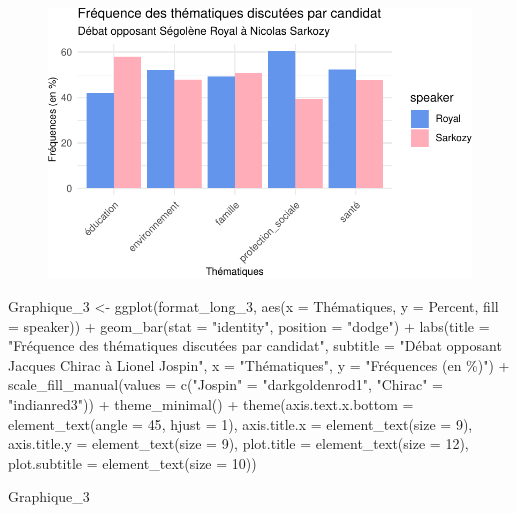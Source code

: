 \documentclass[
  letterpaper,
  DIV=11,
  numbers=noendperiod]{scrartcl}
\newenvironment{Shaded}{\begin{snugshade}}{\end{snugshade}}
\newcommand{\AttributeTok}[1]{\textcolor[rgb]{0.40,0.45,0.13}{#1}}
\newcommand{\DecValTok}[1]{\textcolor[rgb]{0.68,0.00,0.00}{#1}}
\newcommand{\FunctionTok}[1]{\textcolor[rgb]{0.28,0.35,0.67}{#1}}
\newcommand{\NormalTok}[1]{\textcolor[rgb]{0.00,0.23,0.31}{#1}}
\newcommand{\OtherTok}[1]{\textcolor[rgb]{0.00,0.23,0.31}{#1}}
\newcommand{\SpecialCharTok}[1]{\textcolor[rgb]{0.37,0.37,0.37}{#1}}
\newcommand{\StringTok}[1]{\textcolor[rgb]{0.13,0.47,0.30}{#1}}
\begin{document}
\begin{figure}[H]

{\centering \includegraphics{Travail-Session_files/figure-pdf/unnamed-chunk-2-2.pdf}

}

\end{figure}

\begin{Shaded}
\begin{Highlighting}[]
\NormalTok{Graphique\_3 }\OtherTok{\textless{}{-}} \FunctionTok{ggplot}\NormalTok{(format\_long\_3, }\FunctionTok{aes}\NormalTok{(}\AttributeTok{x =}\NormalTok{ Thématiques, }\AttributeTok{y =}\NormalTok{ Percent, }\AttributeTok{fill =}\NormalTok{ speaker)) }\SpecialCharTok{+} \FunctionTok{geom\_bar}\NormalTok{(}\AttributeTok{stat =} \StringTok{"identity"}\NormalTok{, }\AttributeTok{position =} \StringTok{"dodge"}\NormalTok{) }\SpecialCharTok{+} \FunctionTok{labs}\NormalTok{(}\AttributeTok{title =} \StringTok{"Fréquence des thématiques discutées par candidat"}\NormalTok{, }\AttributeTok{subtitle =} \StringTok{"Débat opposant Jacques Chirac à Lionel Jospin"}\NormalTok{, }\AttributeTok{x =} \StringTok{"Thématiques"}\NormalTok{, }\AttributeTok{y =} \StringTok{"Fréquences (en \%)"}\NormalTok{) }\SpecialCharTok{+} \FunctionTok{scale\_fill\_manual}\NormalTok{(}\AttributeTok{values =} \FunctionTok{c}\NormalTok{(}\StringTok{"Jospin"} \OtherTok{=} \StringTok{"darkgoldenrod1"}\NormalTok{, }\StringTok{"Chirac"} \OtherTok{=} \StringTok{"indianred3"}\NormalTok{)) }\SpecialCharTok{+} \FunctionTok{theme\_minimal}\NormalTok{() }\SpecialCharTok{+} \FunctionTok{theme}\NormalTok{(}\AttributeTok{axis.text.x.bottom =} \FunctionTok{element\_text}\NormalTok{(}\AttributeTok{angle =} \DecValTok{45}\NormalTok{, }\AttributeTok{hjust =} \DecValTok{1}\NormalTok{), }\AttributeTok{axis.title.x =} \FunctionTok{element\_text}\NormalTok{(}\AttributeTok{size =} \DecValTok{9}\NormalTok{), }\AttributeTok{axis.title.y =} \FunctionTok{element\_text}\NormalTok{(}\AttributeTok{size =} \DecValTok{9}\NormalTok{), }\AttributeTok{plot.title =} \FunctionTok{element\_text}\NormalTok{(}\AttributeTok{size =} \DecValTok{12}\NormalTok{), }\AttributeTok{plot.subtitle =} \FunctionTok{element\_text}\NormalTok{(}\AttributeTok{size =} \DecValTok{10}\NormalTok{))}

\NormalTok{Graphique\_3}
\end{Highlighting}
\end{Shaded}
\end{document}
